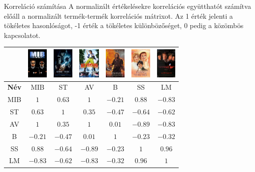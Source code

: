 \documentclass[english, aspectratio=169]{beamer}
\begin{document}
\begin{frame}{Korreláció számítása}
A normalizált értékelésekre korrelációs együtthatót számítva előáll a normalizált termék-termék korrelációs mátrixot. Az 1 érték jelenti a tökéletes hasonlóságot, -1 érték a tökéletes különbözőséget, 0 pedig a közömbös kapcsolatot. 
\begin{center}
\begin{tabular}{|c|c|c|c|c|c|c|}
\hline
& 
\includegraphics[height=1.5cm, keepaspectratio]{images/movies/men_in_black.png} &
\includegraphics[height=1.5cm, keepaspectratio]{images/movies/star_trek.png} &
\includegraphics[height=1.5cm, keepaspectratio]{images/movies/ace_ventura.png} &
\includegraphics[height=1.5cm, keepaspectratio]{images/movies/braveheart.png} &
\includegraphics[height=1.5cm, keepaspectratio]{images/movies/sense_and_sensibility.png} &
\includegraphics[height=1.5cm, keepaspectratio]{images/movies/les_miserables.png} \\
\hline
\textbf{Név} & MIB & ST & AV & B & SS & LM\\ 
\hline
MIB & $1$ & $0.63$ & $1$ & $-0.21$ & $0.88$ & $-0.83$ \\
\hline
ST  & $0.63$ & $1$ & $0.35$ & $-0.47$ & $-0.64$ & $-0.62$ \\
\hline
AV  & $1$ & $0.35$ & $1$ & $0.01$ & $-0.89$ & $-0.83$ \\
\hline
B   & $-0.21$ & $-0.47$ & $0.01$ & $1$ & $-0.23$ & $-0.32$ \\
\hline
SS  & $0.88$ & $-0.64$ & $-0.89$ & $-0.23$ & $1$ & $0.96$ \\
\hline
LM  & $-0.83$ & $-0.62$ & $-0.83$ & $-0.32$ & $0.96$ & $1$ \\
\hline
\end{tabular}
\end{center}
\end{frame}
\end{document}
